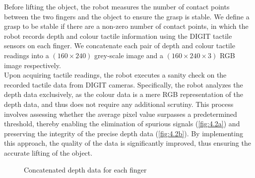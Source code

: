 \documentclass[11pt, a4paper]{report}
\begin{document}
Before lifting the object, the robot measures the number of contact points between the two fingers and the object to ensure the grasp is stable. We define a grasp to be stable if there are a non-zero number of contact points, in which the robot records depth and colour tactile information using the DIGIT \cite{Lambeta2020DIGIT} tactile sensors on each finger. We concatenate each pair of depth and colour tactile readings into a $(160\times240)$ grey-scale image and a $(160\times240\times3)$ RGB image respectively.\\

Upon acquiring tactile readings, the robot executes a sanity check on the recorded tactile data from DIGIT cameras. Specifically, the robot analyzes the depth data exclusively, as the colour data is a mere RGB representation of the depth data, and thus does not require any additional scrutiny. This process involves assessing whether the average pixel value surpasses a predetermined threshold, thereby enabling the elimination of spurious signals (\ref{fig:4.2a}) and preserving the integrity of the precise depth data (\ref{fig:4.2b}). By implementing this approach, the quality of the data is significantly improved, thus ensuring the accurate lifting of the object.

\begin{figure}[H]%
    \centering
    \qquad
    \caption{Concatenated depth data for each finger}%
    \label{fig:4.2}%
\end{figure}
\end{document}
